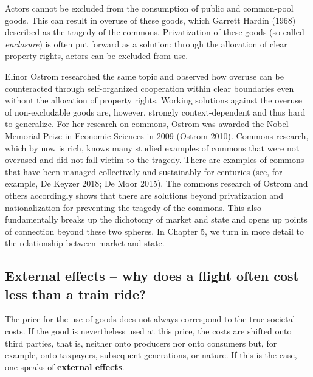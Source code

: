 \documentclass[
  british,
  a4paper,
  DIV=11,
  numbers=noendperiod,
  oneside,
  openany]{scrreprt}
\begin{document}
\begin{tcolorbox}[enhanced jigsaw, arc=.35mm, bottomrule=.15mm, bottomtitle=1mm, breakable, colback=white, colbacktitle=quarto-callout-tip-color!10!white, colframe=quarto-callout-tip-color-frame, coltitle=black, left=2mm, leftrule=.75mm, opacityback=0, opacitybacktitle=0.6, rightrule=.15mm, title={The tragedy of the commons and how to overcome it}, titlerule=0mm, toprule=.15mm, toptitle=1mm]

Actors cannot be excluded from the consumption of public and common-pool
goods. This can result in overuse of these goods, which Garrett Hardin
(1968) described as the tragedy of the commons. Privatization of these
goods (so-called \emph{enclosure}) is often put forward as a solution:
through the allocation of clear property rights, actors can be excluded
from use.

Elinor Ostrom researched the same topic and observed how overuse can be
counteracted through self-organized cooperation within clear boundaries
even without the allocation of property rights. Working solutions
against the overuse of non-excludable goods are, however, strongly
context-dependent and thus hard to generalize. For her research on
commons, Ostrom was awarded the Nobel Memorial Prize in Economic
Sciences in 2009 (Ostrom 2010). Commons research, which by now is rich,
knows many studied examples of commons that were not overused and did
not fall victim to the tragedy. There are examples of commons that have
been managed collectively and sustainably for centuries (see, for
example, De Keyzer 2018; De Moor 2015). The commons research of Ostrom
and others accordingly shows that there are solutions beyond
privatization and nationalization for preventing the tragedy of the
commons. This also fundamentally breaks up the dichotomy of market and
state and opens up points of connection beyond these two spheres. In
Chapter 5, we turn in more detail to the relationship between market and
state.

\end{tcolorbox}

\subsection{External effects -- why does a flight often cost less than a
train
ride?}\label{external-effects-why-does-a-flight-often-cost-less-than-a-train-ride}

The price for the use of goods does not always correspond to the true
societal costs. If the good is nevertheless used at this price, the
costs are shifted onto third parties, that is, neither onto producers
nor onto consumers but, for example, onto taxpayers, subsequent
generations, or nature. If this is the case, one speaks of
\textbf{external effects}.
\end{document}
